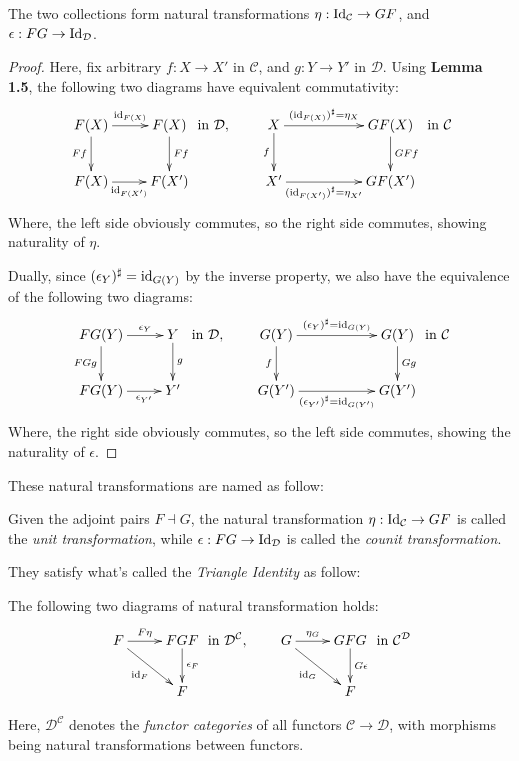 \documentclass{article}
\begin{document}
\begin{prop}
The two collections form natural transformations $\eta:\mathrm{Id}_\mathcal{C}\rightarrow GF$, and $\epsilon:FG\rightarrow \mathrm{Id}_\mathcal{D}$.
\end{prop}
\begin{proof}
    Here, fix arbitrary $f:X\rightarrow X'$ in $\mathcal{C}$, and $g:Y\rightarrow Y'$ in $\mathcal{D}$. Using \textbf{Lemma 1.5}, the following two diagrams have equivalent commutativity:
    \[\xymatrix{
        F(X) \ar[d]_-{Ff} \ar[r]^-{\id_{F(X)}} & F(X) \ar[d]^-{Ff}\\
        F(X)\ar[r]_-{\id_{F(X')}} & F(X')
    } \text{ in }\mathcal{D},\quad \quad \xymatrix{
        X \ar[d]_-{f} \ar[rr]^-{(\id_{F(X)})^\sharp=\eta_X} && GF(X) \ar[d]^-{GFf}\\
        X'\ar[rr]_-{(\id_{F(X')})^\sharp=\eta_{X'}} && GF(X')
    } \text{ in }\mathcal{C}\]
    Where, the left side obviously commutes, so the right side commutes, showing naturality of $\eta$.

    Dually, since $(\epsilon_Y)^\sharp = \mathrm{id}_{G(Y)}$ by the inverse property, we also have the equivalence of the following two diagrams:
    \[\xymatrix{
        FG(Y) \ar[d]_-{FGg} \ar[r]^-{\epsilon_Y} & Y \ar[d]^-{g}\\
        FG(Y)\ar[r]_-{\epsilon_{Y'}} & Y'
    } \text{ in }\mathcal{D},\quad \quad \xymatrix{
        G(Y) \ar[d]_-{f} \ar[rr]^-{(\epsilon_Y)^\sharp = \id_{G(Y)}} && G(Y) \ar[d]^-{Gg}\\
        G(Y')\ar[rr]_-{(\epsilon_{Y'})^\sharp=\id_{G(Y')}} && G(Y')
    } \text{ in }\mathcal{C}\]
    Where, the right side obviously commutes, so the left side commutes, showing the naturality of $\epsilon$.
\end{proof}

These natural transformations are named as follow:
\begin{defn}
    Given the adjoint pairs $F\dashv G$, the natural transformation $\eta:\mathrm{Id}_\mathcal{C}\rightarrow GF$ is called the \emph{unit transformation}, while $\epsilon:FG\rightarrow \mathrm{Id}_\mathcal{D}$ is called the \emph{counit transformation}.
\end{defn}

They satisfy what's called the \emph{Triangle Identity} as follow:
\begin{prop}
    The following two diagrams of natural transformation holds:
    \[\xymatrix{
        F \ar[r]^-{F\eta} \ar[dr]_-{\id_F} & FGF \ar[d]^-{\epsilon_F}\\
        & F
    } \text{ in }\mathcal{D}^\mathcal{C},\quad \quad \xymatrix{
        G \ar[r]^-{\eta_G} \ar[dr]_-{\id_G} & GFG \ar[d]^-{G\epsilon}\\
        & F
    } \text{ in }\mathcal{C}^\mathcal{D}\]
\end{prop}
Here, $\mathcal{D}^\mathcal{C}$ denotes the \emph{functor categories} of all functors $\mathcal{C}\rightarrow \mathcal{D}$, with morphisms being natural transformations between functors.
\end{document}
